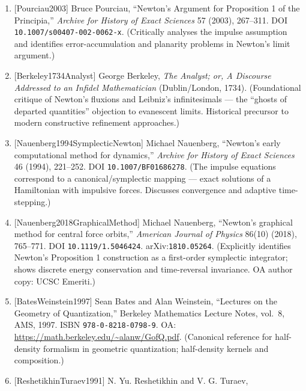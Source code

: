 \documentclass[
]{article}
\begin{document}
\begin{enumerate}
  in the Principia: Filling in some details in Newton's proof of Prop.
  1,'' \emph{Historia Mathematica} 30 (2003), 441--456.
  arXiv:\texttt{math/0112048}. DOI
  \texttt{10.1016/S0315-0860(02)00027-7}. (Defends Newton's continuum
  limit via Lemma 3; the polygonal construction has a well-defined limit
  parameterizing a continuous planar curve.)
\item
  {[}Pourciau2003{]} Bruce Pourciau, ``Newton's Argument for Proposition
  1 of the Principia,'' \emph{Archive for History of Exact Sciences} 57
  (2003), 267--311. DOI \texttt{10.1007/s00407-002-0062-x}. (Critically
  analyses the impulse assumption and identifies error-accumulation and
  planarity problems in Newton's limit argument.)
\item
  {[}Berkeley1734Analyst{]} George Berkeley, \emph{The Analyst; or, A
  Discourse Addressed to an Infidel Mathematician} (Dublin/London,
  1734). (Foundational critique of Newton's fluxions and Leibniz's
  infinitesimals --- the ``ghosts of departed quantities'' objection to
  evanescent limits. Historical precursor to modern constructive
  refinement approaches.)
\item
  {[}Nauenberg1994SymplecticNewton{]} Michael Nauenberg, ``Newton's
  early computational method for dynamics,'' \emph{Archive for History
  of Exact Sciences} 46 (1994), 221--252. DOI
  \texttt{10.1007/BF01686278}. (The impulse equations correspond to a
  canonical/symplectic mapping --- exact solutions of a Hamiltonian with
  impulsive forces. Discusses convergence and adaptive time-stepping.)
\item
  {[}Nauenberg2018GraphicalMethod{]} Michael Nauenberg, ``Newton's
  graphical method for central force orbits,'' \emph{American Journal of
  Physics} 86(10) (2018), 765--771. DOI \texttt{10.1119/1.5046424}.
  arXiv:\texttt{1810.05264}. (Explicitly identifies Newton's Proposition
  1 construction as a first-order symplectic integrator; shows discrete
  energy conservation and time-reversal invariance. OA author copy: UCSC
  Emeriti.)
\item
  {[}BatesWeinstein1997{]} Sean Bates and Alan Weinstein, ``Lectures on
  the Geometry of Quantization,'' Berkeley Mathematics Lecture Notes,
  vol.~8, AMS, 1997. ISBN \texttt{978-0-8218-0798-9}. OA:
  \url{https://math.berkeley.edu/~alanw/GofQ.pdf}. (Canonical reference
  for half-density formalism in geometric quantization; half-density
  kernels and composition.)
\item
  {[}ReshetikhinTuraev1991{]} N. Yu. Reshetikhin and V. G. Turaev,

\end{enumerate}
\end{document}
